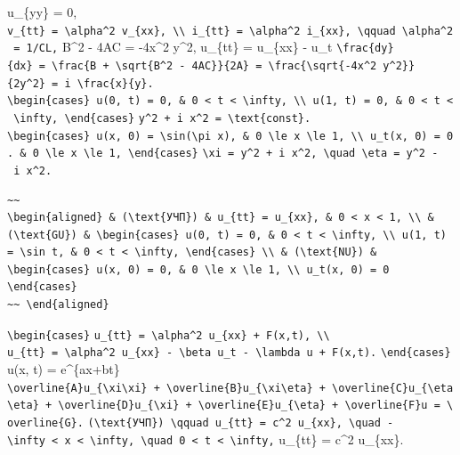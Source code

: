 \documentclass[
  ukrainian,
]{article}
\begin{document}
u\_\{yy\} = 0,
\texttt{v\_\{tt\}\ =\ \textbackslash{}alpha\^{}2\ v\_\{xx\},\ \textbackslash{}\textbackslash{}\ i\_\{tt\}\ =\ \textbackslash{}alpha\^{}2\ i\_\{xx\},\ \textbackslash{}qquad\ \textbackslash{}alpha\^{}2\ =\ 1/CL,}
B\^{}2 - 4AC = -4x\^{}2 y\^{}2, u\_\{tt\} = u\_\{xx\} - u\_t
\texttt{\textbackslash{}frac\{dy\}\{dx\}\ =\ \textbackslash{}frac\{B\ +\ \textbackslash{}sqrt\{B\^{}2\ -\ 4AC\}\}\{2A\}\ =\ \textbackslash{}frac\{\textbackslash{}sqrt\{-4x\^{}2\ y\^{}2\}\}\{2y\^{}2\}\ =\ i\ \textbackslash{}frac\{x\}\{y\}.}
\texttt{\textbackslash{}begin\{cases\}\ u(0,\ t)\ =\ 0,\ \&\ 0\ \textless{}\ t\ \textless{}\ \textbackslash{}infty,\ \textbackslash{}\textbackslash{}\ u(1,\ t)\ =\ 0,\ \&\ 0\ \textless{}\ t\ \textless{}\ \textbackslash{}infty,\ \textbackslash{}end\{cases\}}
\texttt{y\^{}2\ +\ i\ x\^{}2\ =\ \textbackslash{}text\{const\}.}
\texttt{\textbackslash{}begin\{cases\}\ u(x,\ 0)\ =\ \textbackslash{}sin(\textbackslash{}pi\ x),\ \&\ 0\ \textbackslash{}le\ x\ \textbackslash{}le\ 1,\ \textbackslash{}\textbackslash{}\ u\_t(x,\ 0)\ =\ 0.\ \&\ 0\ \textbackslash{}le\ x\ \textbackslash{}le\ 1,\ \textbackslash{}end\{cases\}}
\texttt{\textbackslash{}xi\ =\ y\^{}2\ +\ i\ x\^{}2,\ \textbackslash{}quad\ \textbackslash{}eta\ =\ y\^{}2\ -\ i\ x\^{}2.}

\begin{verbatim}
~~
\begin{aligned} & (\text{УЧП}) & u_{tt} = u_{xx}, & 0 < x < 1, \\ & (\text{GU}) & \begin{cases} u(0, t) = 0, & 0 < t < \infty, \\ u(1, t) = \sin t, & 0 < t < \infty, \end{cases} \\ & (\text{NU}) & \begin{cases} u(x, 0) = 0, & 0 \le x \le 1, \\ u_t(x, 0) = 0 \end{cases}
~~ \end{aligned}
\end{verbatim}

\texttt{\textbackslash{}begin\{cases\}}
\texttt{u\_\{tt\}\ =\ \textbackslash{}alpha\^{}2\ u\_\{xx\}\ +\ F(x,t),\ \textbackslash{}\textbackslash{}}
\texttt{u\_\{tt\}\ =\ \textbackslash{}alpha\^{}2\ u\_\{xx\}\ -\ \textbackslash{}beta\ u\_t\ -\ \textbackslash{}lambda\ u\ +\ F(x,t).}
\texttt{\textbackslash{}end\{cases\}} u(x, t) = e\^{}\{ax+bt\}
\texttt{\textbackslash{}overline\{A\}u\_\{\textbackslash{}xi\textbackslash{}xi\}\ +\ \textbackslash{}overline\{B\}u\_\{\textbackslash{}xi\textbackslash{}eta\}\ +\ \textbackslash{}overline\{C\}u\_\{\textbackslash{}eta\textbackslash{}eta\}\ +\ \textbackslash{}overline\{D\}u\_\{\textbackslash{}xi\}\ +\ \textbackslash{}overline\{E\}u\_\{\textbackslash{}eta\}\ +\ \textbackslash{}overline\{F\}u\ =\ \textbackslash{}overline\{G\}.}
\texttt{(\textbackslash{}text\{УЧП\})\ \textbackslash{}qquad\ u\_\{tt\}\ =\ c\^{}2\ u\_\{xx\},\ \textbackslash{}quad\ -\textbackslash{}infty\ \textless{}\ x\ \textless{}\ \textbackslash{}infty,\ \textbackslash{}quad\ 0\ \textless{}\ t\ \textless{}\ \textbackslash{}infty,}
u\_\{tt\} = c\^{}2 u\_\{xx\}.
\end{document}
